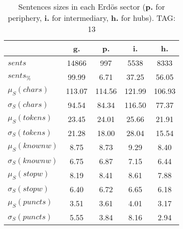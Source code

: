 \begin{table}[h!]
\begin{center}
\begin{tabular}{| l || c | c | c | c |}\hline
 & {\bf g.} & {\bf p.} & {\bf i.} & {\bf h.} \\\hline\hline
$sents$ & 14866  & 997  & 5538  & 8333 \\
$sents_{\%}$ & 99.99  & 6.71  & 37.25  & 56.05 \\\hline
$\mu_S(chars)$ & 113.07  & 114.56  & 121.99  & 106.93 \\
$\sigma_S(chars)$ & 94.54  & 84.34  & 116.50  & 77.37 \\\hline
$\mu_S(tokens)$ & 23.45  & 24.01  & 25.66  & 21.91 \\
$\sigma_S(tokens)$ & 21.28  & 18.00  & 28.04  & 15.54 \\\hline
$\mu_S(knownw)$ & 8.75  & 8.73  & 9.29  & 8.40 \\
$\sigma_S(knownw)$ & 6.75  & 6.87  & 7.15  & 6.44 \\\hline
$\mu_S(stopw)$ & 8.19  & 8.41  & 8.61  & 7.88 \\
$\sigma_S(stopw)$ & 6.40  & 6.72  & 6.65  & 6.18 \\\hline
$\mu_S(puncts)$ & 3.51  & 3.61  & 4.01  & 3.17 \\
$\sigma_S(puncts)$ & 5.55  & 3.84  & 8.16  & 2.94 \\\hline
\end{tabular}
\caption{Sentences sizes in each Erd\"os sector ({{\bf p.}} for periphery, {{\bf i.}} for intermediary, {{\bf h.}} for hubs). TAG: 13}
\end{center}
\end{table}
